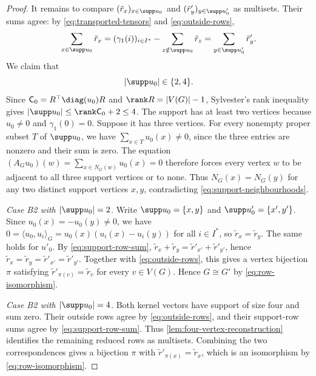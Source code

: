 \begin{proof}
  It remains to compare $(\tilde{r}_x)_{x\in\supp u_0}$ and
  $(\tilde{r}'_y)_{y\in\supp u'_0}$ as multisets.
  Their sums agree: by
  \cref{eq:transported-tensors} and \cref{eq:outside-rows},
  \begin{equation}\label{eq:support-row-sum}
    \sum_{x\in\supp u_0}\tilde{r}_x
    = (\gamma_1(i))_{i\in I^*}-\sum_{z\notin\supp u_0}\tilde{r}_z
    = \sum_{y\in\supp u'_0}\tilde{r}'_y.
  \end{equation}
  We claim that
  \begin{equation}\label{eq:kernel-support-sizes}
    |\supp u_0|\in\{2,4\}.
  \end{equation}
  Since $\mathsf{C}_0 = R^{\top} \diag(u_0) R$ and
  $\rank R=|V(G)|-1$, Sylvester's rank inequality gives
  $|\supp u_0| \leq \rank \mathsf{C}_0 + 2 \leq 4$.
  The support has at least two vertices because $u_0\ne0$ and
  $\gamma_1(0)=0$.
  Suppose it has three vertices. For every nonempty proper subset
  $T$ of $\supp u_0$, we have $\sum_{x\in T}u_0(x)\ne0$, since
  the three entries are nonzero and their sum is zero.
  The equation $(A_Gu_0)(w)=\sum_{x\in N_G(w)}u_0(x)=0$ therefore
  forces every vertex $w$ to be adjacent to all three support
  vertices or to none. Thus $N_G(x)=N_G(y)$ for any two distinct
  support vertices $x,y$, contradicting \cref{eq:support-neighbourhoods}.

  \emph{Case B2 with $|\supp u_0|=2$.} Write
  $\supp u_0=\{x,y\}$ and $\supp u'_0=\{x',y'\}$.
  Since $u_0(x)=-u_0(y)\ne0$, we have
  $0=\langle u_0,u_i\rangle_G=u_0(x)(u_i(x)-u_i(y))$ for all $i\in I^*$,
  so $\tilde{r}_x=\tilde{r}_y$. The same holds for $u'_0$.
  By \cref{eq:support-row-sum},
  $\tilde{r}_x+\tilde{r}_y=\tilde{r}'_{x'}+\tilde{r}'_{y'}$, hence
  $\tilde{r}_x=\tilde{r}_y=\tilde{r}'_{x'}=\tilde{r}'_{y'}$.
  Together with \cref{eq:outside-rows}, this gives a vertex bijection
  $\pi$ satisfying $\tilde{r}'_{\pi(v)}=\tilde{r}_v$ for every $v\in V(G)$.
  Hence $G\cong G'$ by \cref{eq:row-isomorphism}.

  \emph{Case B2 with $|\supp u_0|=4$.}
  Both kernel vectors have support of size four and sum zero.
  Their outside rows agree by \cref{eq:outside-rows}, and their
  support-row sums agree by \cref{eq:support-row-sum}.
  Thus \cref{lem:four-vertex-reconstruction} identifies the remaining
  reduced rows as multisets.
  Combining the two correspondences gives a bijection $\pi$ with
  $\tilde{r}'_{\pi(x)}=\tilde{r}_x$, which is an isomorphism by \cref{eq:row-isomorphism}.
\end{proof}

